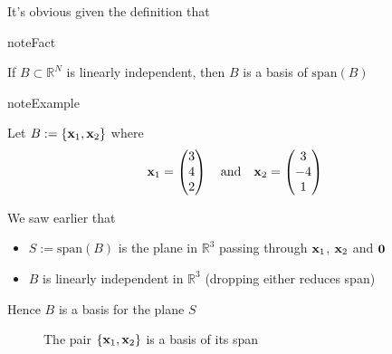 \documentclass[letterpaper,10pt,english]{jupyterBook}
\begin{document}
\sphinxAtStartPar
It’s obvious given the definition that

\begin{sphinxadmonition}{note}{Fact}

\sphinxAtStartPar
If \(B \subset \mathbb{R}^N\) is linearly independent, then \(B\) is a basis of \(\mathrm{span}(B)\)
\end{sphinxadmonition}

\begin{sphinxadmonition}{note}{Example}

\sphinxAtStartPar
Let \(B := \{{\bf x}_1, {\bf x}_2\}\) where
\begin{equation*}
\begin{split}
%
{\bf x}_1 =
\begin{pmatrix}
3 \\
4 \\
2
\end{pmatrix}
\quad \text{and} \quad
{\bf x}_2 =
\begin{pmatrix}
3 \\
-4 \\
1
\end{pmatrix}
%
\end{split}
\end{equation*}\end{sphinxadmonition}

\sphinxAtStartPar
We saw earlier that
\begin{itemize}
\item {} 
\sphinxAtStartPar
\(S := \mathrm{span}(B)\) is the plane in \(\mathbb{R}^3\) passing through
\({\bf x}_1\), \({\bf x}_2\) and \({\bf 0}\)

\item {} 
\sphinxAtStartPar
\(B\) is linearly independent in \(\mathbb{R}^3\) (dropping either reduces span)

\end{itemize}

\sphinxAtStartPar
Hence \(B\) is a basis for the plane \(S\)

\begin{figure}[htbp]
\centering
\capstart

\noindent{}
\caption{The pair \(\{{\bf x}_1, {\bf x}_2\}\) is a basis of its span}\label{\detokenize{05.linear_algebra:id11}}\end{figure}
\end{document}

